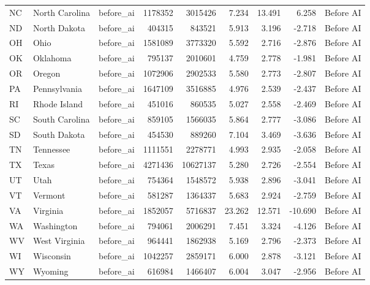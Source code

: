 \begin{tabular}{lllrrrrrl}
NC & North Carolina & before\_ai & 1178352 & 3015426 & 7.234 & 13.491 & 6.258 & Before AI \\
ND & North Dakota & before\_ai & 404315 & 843521 & 5.913 & 3.196 & -2.718 & Before AI \\
OH & Ohio & before\_ai & 1581089 & 3773320 & 5.592 & 2.716 & -2.876 & Before AI \\
OK & Oklahoma & before\_ai & 795137 & 2010601 & 4.759 & 2.778 & -1.981 & Before AI \\
OR & Oregon & before\_ai & 1072906 & 2902533 & 5.580 & 2.773 & -2.807 & Before AI \\
PA & Pennsylvania & before\_ai & 1647109 & 3516885 & 4.976 & 2.539 & -2.437 & Before AI \\
RI & Rhode Island & before\_ai & 451016 & 860535 & 5.027 & 2.558 & -2.469 & Before AI \\
SC & South Carolina & before\_ai & 859105 & 1566035 & 5.864 & 2.777 & -3.086 & Before AI \\
SD & South Dakota & before\_ai & 454530 & 889260 & 7.104 & 3.469 & -3.636 & Before AI \\
TN & Tennessee & before\_ai & 1111551 & 2278771 & 4.993 & 2.935 & -2.058 & Before AI \\
TX & Texas & before\_ai & 4271436 & 10627137 & 5.280 & 2.726 & -2.554 & Before AI \\
UT & Utah & before\_ai & 754364 & 1548572 & 5.938 & 2.896 & -3.041 & Before AI \\
VT & Vermont & before\_ai & 581287 & 1364337 & 5.683 & 2.924 & -2.759 & Before AI \\
VA & Virginia & before\_ai & 1852057 & 5716837 & 23.262 & 12.571 & -10.690 & Before AI \\
WA & Washington & before\_ai & 794061 & 2006291 & 7.451 & 3.324 & -4.126 & Before AI \\
WV & West Virginia & before\_ai & 964441 & 1862938 & 5.169 & 2.796 & -2.373 & Before AI \\
WI & Wisconsin & before\_ai & 1042257 & 2859171 & 6.000 & 2.878 & -3.121 & Before AI \\
WY & Wyoming & before\_ai & 616984 & 1466407 & 6.004 & 3.047 & -2.956 & Before AI \\
\bottomrule
\end{tabular}
